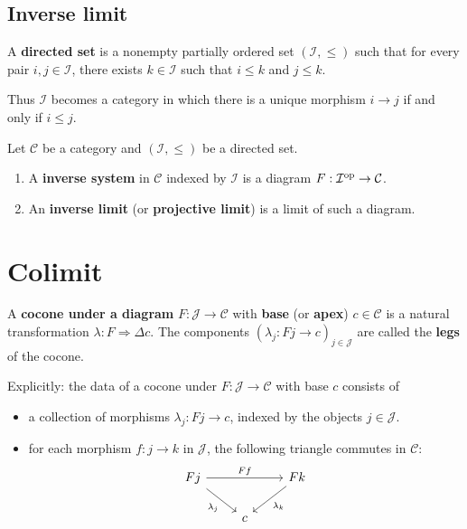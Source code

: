 \documentclass[12pt, oneside]{book}
\begin{document}
\subsection{Inverse limit}
\begin{definition}
    A \textbf{directed set} is a nonempty partially ordered set $\left(\mathcal{I},\leq\right)$ such that for every pair $i,j\in \mathcal{I}$, there exists $k\in \mathcal{I}$ such that $i\leq k$ and $j\leq k$.
    \begin{remark}
        Thus $\mathcal{I}$ becomes a category in which there is a unique morphism $i\to j$ if and only if $i\leq j$.
    \end{remark}
\end{definition}

\begin{definition}
    Let $\mathcal{C}$ be a category and $\left(\mathcal{I},\leq\right)$ be a directed set.
    \begin{enumerate}
        \item
              A \textbf{inverse system} in $\mathcal{C}$ indexed by $\mathcal{I}$ is a diagram $F:\mathcal{I}^{\mathrm{op}}\to\mathcal{C}$.
        \item
              An \textbf{inverse limit} (or \textbf{projective limit}) is a limit of such a diagram.
    \end{enumerate}
\end{definition}


\section{Colimit}
\begin{definition}
    A \textbf{cocone under a diagram} $F:\mathcal{J} \to \mathcal{C}$ with \textbf{base} (or \textbf{apex}) $c\in\mathcal{C}$ is a natural transformation $\lambda:F\Rightarrow \Delta c$.
    The components $(\lambda_j:Fj\to c)_{j\in\mathcal{J}}$ are called the \textbf{legs} of the cocone.
    \begin{remark}
        Explicitly: the data of a cocone under $F: \mathcal{J} \rightarrow \mathcal{C}$ with base $c$ consists of
        \begin{itemize}
            \item
                  a collection of morphisms $\lambda_j: F j \rightarrow c$, indexed by the objects $j \in \mathcal{J}$.
            \item
                  for each morphism $f: j \rightarrow k$ in $\mathcal{J}$, the following triangle commutes in $\mathcal{C}$:
                  \begin{equation*}
                      \begin{tikzcd}
                          Fj\arrow[rr,"Ff"]\arrow[rd,"\lambda_j"']&&Fk\arrow[ld,"\lambda_k"]\\
                          &c&
                      \end{tikzcd}
                  \end{equation*}
        \end{itemize}
    \end{remark}
\end{definition}
\end{document}
